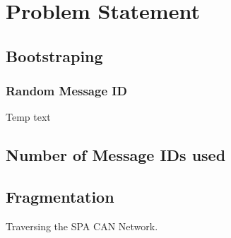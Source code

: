 \section{Problem Statement}

\subsection{Bootstraping}
\subsubsection{Random Message ID}
Temp text
\subsection{Number of Message IDs used}
\subsection{Fragmentation}
Traversing the SPA CAN Network.

